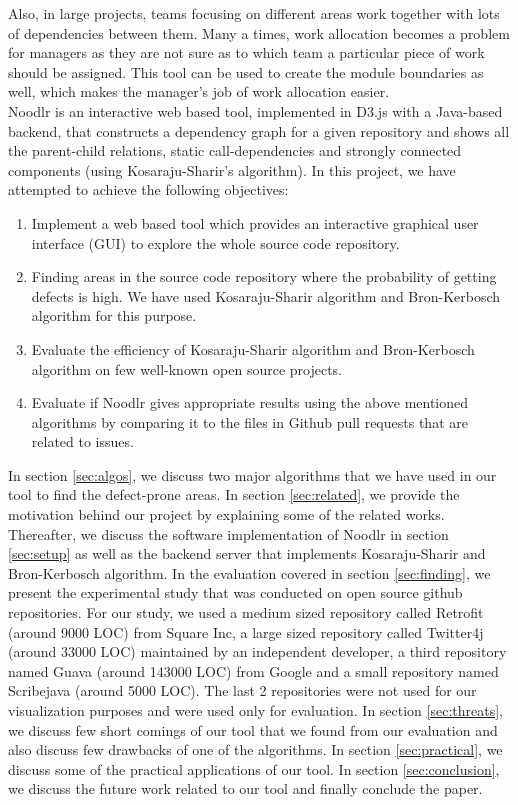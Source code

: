 Also, in large projects, teams focusing on different areas work together with lots of dependencies between them. Many a times, work allocation becomes a problem for managers as they are not sure as to which team a particular piece of work should be assigned. This tool can be used to create the module boundaries as well, which makes the manager's job of work allocation easier.\\

Noodlr is an interactive web based tool, implemented in D3.js with a Java-based backend, that constructs a dependency graph for a given repository and shows all the parent-child relations, static call-dependencies and strongly connected components (using Kosaraju-Sharir's algorithm\cite{sharir1981strong}). In this project, we have attempted to achieve the following objectives:
\begin{enumerate}
    \item Implement a web based tool which provides an interactive graphical user interface (GUI) to explore the whole source code repository.
    \item Finding areas in the source code repository where the probability of getting defects is high. We have used Kosaraju-Sharir algorithm and Bron-Kerbosch algorithm for this purpose.
    \item Evaluate the efficiency of Kosaraju-Sharir algorithm and Bron-Kerbosch algorithm on few well-known open source projects.
    \item Evaluate if Noodlr gives appropriate results using the above mentioned algorithms by comparing it to the files in Github pull requests that are related to issues.
\end{enumerate}

In section \ref{sec:algos}, we discuss two major algorithms that we have used in our tool to find the defect-prone areas. In section \ref{sec:related}, we provide the motivation behind our project by explaining some of the related works. Thereafter, we discuss the software implementation of Noodlr in section \ref{sec:setup} as well as the backend server that implements Kosaraju-Sharir and Bron-Kerbosch algorithm. In the evaluation covered in section \ref{sec:finding}, we present the experimental study that was conducted on open source github repositories. For our study, we used a medium sized repository called Retrofit (around 9000 LOC) from Square Inc, a large sized repository called Twitter4j (around 33000 LOC) maintained by an independent developer, a third repository named Guava (around 143000 LOC) from Google and a small repository named Scribejava (around 5000 LOC). The last 2 repositories were not used for our visualization purposes and were used only for evaluation. In section \ref{sec:threats}, we discuss few short comings of our tool that we found from our evaluation and also discuss few drawbacks of one of the algorithms. In section \ref{sec:practical}, we discuss some of the practical applications of our tool. In section \ref{sec:conclusion}, we discuss the future work related to our tool and finally conclude the paper.

